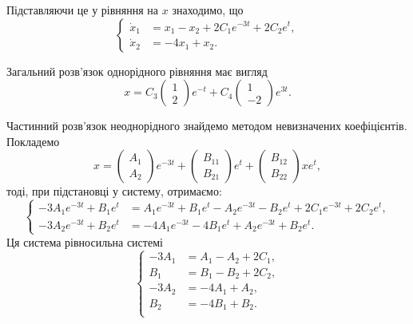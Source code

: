 \begin{solution}
	Підставляючи це у рівняння на $x$ знаходимо, що 
    \[ \left\{ \begin{aligned}
        \dot x_1 &= x_1 - x_2 + 2 C_1 e^{-3t} + 2 C_2 e^{t}, \\
		\dot x_2 &= - 4 x_1 + x_2.
    \end{aligned} \right. \]
    
    Загальний розв'язок однорідного рівняння має вигляд 
    \begin{equation}
        x = C_3 \begin{pmatrix} 1 \\ 2 \end{pmatrix} e^{-t} + C_4 \begin{pmatrix} 1 \\ -2 \end{pmatrix} e^{3t}.
    \end{equation}
    
    Частинний розв'язок неоднорідного знайдемо методом невизначених коефіцієнтів. Покладемо
    \begin{equation}
        x = \begin{pmatrix} A_1 \\ A_2 \end{pmatrix} e^{-3t} + \begin{pmatrix} B_{11} \\ B_{21} \end{pmatrix} e^{t} + \begin{pmatrix} B_{12} \\ B_{22} \end{pmatrix} x e^{t},
    \end{equation}
    тоді, при підстановці у систему, отримаємо:
    \[ \left\{ \begin{aligned}
        - 3 A_1 e^{-3 t} + B_1 e^t &= A_1 e^{-3 t} + B_1 e^t - A_2 e^{-3 t} - B_2 e^t + 2 C_1 e^{-3t} + 2 C_2 e^{t}, \\
		- 3 A_2 e^{-3 t} + B_2 e^t &= - 4 A_1 e^{-3 t} - 4 B_1 e^t + A_2 e^{-3 t} + B_2 e^t.
    \end{aligned} \right. \]
    Ця система рівносильна системі
    \[ \left\{ \begin{aligned}
        - 3 A_1 &= A_1 - A_2 + 2 C_1, \\
        B_1 &= B_1 - B_2 + 2 C_2, \\
		- 3 A_2 &= - 4 A_1 + A_2, \\
		B_2 &= - 4 B_1 + B_2. \\
    \end{aligned} \right. \]
\end{solution}

\begin{problem}
\end{problem}

\begin{solution}
\end{solution}
